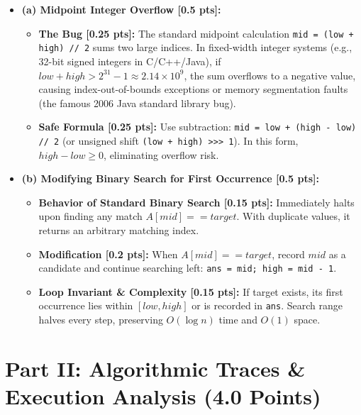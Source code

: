 \documentclass[11pt,a4paper]{article}
\begin{document}
\vspace{0.3em}

\begin{solutionbox}
\begin{itemize}
    \item \textbf{(a) Midpoint Integer Overflow [0.5 pts]:}
    \begin{itemize}
        \item \textbf{The Bug [0.25 pts]:} The standard midpoint calculation \texttt{mid = (low + high) // 2} sums two large indices. In fixed-width integer systems (e.g., 32-bit signed integers in C/C++/Java), if $low + high > 2^{31} - 1 \approx 2.14 \times 10^9$, the sum overflows to a negative value, causing index-out-of-bounds exceptions or memory segmentation faults (the famous 2006 Java standard library bug).
        \item \textbf{Safe Formula [0.25 pts]:} Use subtraction: \texttt{mid = low + (high - low) // 2} (or unsigned shift \texttt{(low + high) >>> 1}). In this form, $high - low \ge 0$, eliminating overflow risk.
    \end{itemize}
    \item \textbf{(b) Modifying Binary Search for First Occurrence [0.5 pts]:}
    \begin{itemize}
        \item \textbf{Behavior of Standard Binary Search [0.15 pts]:} Immediately halts upon finding any match $A[mid] == target$. With duplicate values, it returns an arbitrary matching index.
        \item \textbf{Modification [0.2 pts]:} When $A[mid] == target$, record $mid$ as a candidate and continue searching left: \texttt{ans = mid; high = mid - 1}.
        \item \textbf{Loop Invariant \& Complexity [0.15 pts]:} If target exists, its first occurrence lies within $[low, high]$ or is recorded in \texttt{ans}. Search range halves every step, preserving $O(\log n)$ time and $O(1)$ space.
    \end{itemize}
\end{itemize}
\end{solutionbox}

\newpage

\section*{Part II: Algorithmic Traces \& Execution Analysis (4.0 Points)}
\end{document}
